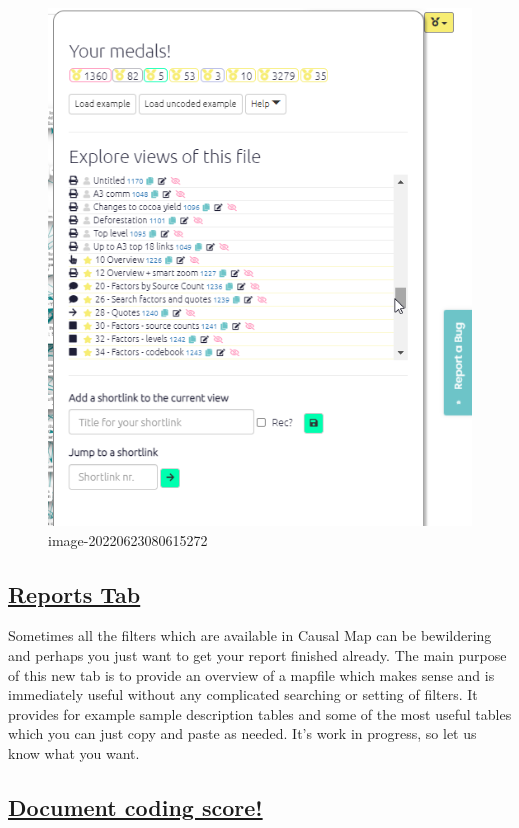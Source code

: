 \documentclass[
]{book}
\begin{document}
\begin{figure}
\centering
\includegraphics{_assets/image-20220623080615272.png}
\caption{image-20220623080615272}
\end{figure}

\hypertarget{reports-tab}{%
\subsection{\texorpdfstring{\href{xreports}{Reports Tab}}{Reports Tab}}\label{reports-tab}}

Sometimes all the filters which are available in Causal Map can be bewildering and perhaps you just want to get your report finished already. The main purpose of this new tab is to provide an overview of a mapfile which makes sense and is immediately useful without any complicated searching or setting of filters. It provides for example sample description tables and some of the most useful tables which you can just copy and paste as needed. It's work in progress, so let us know what you want.

\hypertarget{document-coding-score}{%
\subsection{\texorpdfstring{\protect\hyperlink{xgamification}{Document coding score!}}{Document coding score!}}\label{document-coding-score}}
\end{document}
